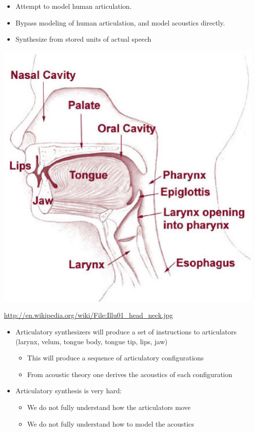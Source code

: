 \documentclass[a4paper,landscape,headrule,footrule,xetex]{foils}
\begin{document}
  \begin{itemize}
  \item {} Attempt to model human articulation.
  \item {} Bypass modeling of human articulation, and model acoustics directly.
  \item {} Synthesize from stored units of actual speech
  \end{itemize}
  

\begin{center}
  \noindent\includegraphics[height=0.8\textheight]{../pics/Illu01_head_neck.eps}
\end{center}

{\small \url{http://en.wikipedia.org/wiki/File:Illu01_head_neck.jpg}}

\begin{itemize}
\item Articulatory synthesizers will produce a set of instructions to articulators (larynx, velum, tongue body, tongue tip, lips, jaw)
  \begin{itemize}
  \item This will produce a sequence of articulatory configurations
  \item From acoustic theory one derives the acoustics of each configuration
  \end{itemize}
\item   Articulatory synthesis is very hard: 
  \begin{itemize}
  \item We do not fully understand how the articulators move
  \item We do not fully understand how to model the acoustics
  \end{itemize}
\end{itemize}
\end{document}
